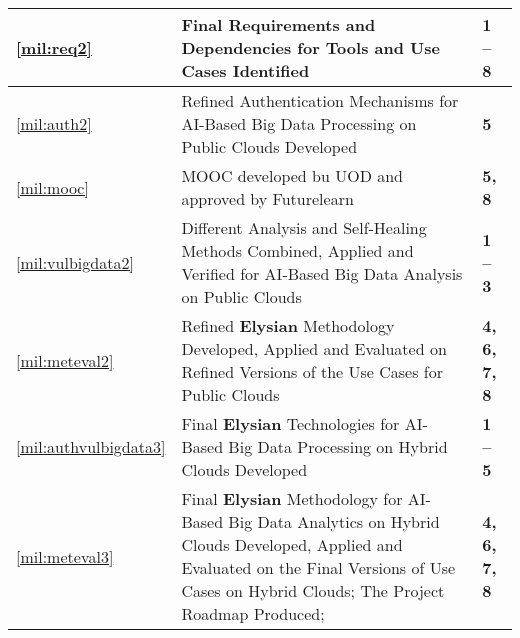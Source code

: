 \documentclass[a4paper,11pt]{article}
\newcommand{\project}[1]{\textbf{#1}\xspace}
\newcommand{\SECURITY}{\project{Elysian}}
\newcommand{\TheProject}{\SECURITY}
\begin{document}
\begin{center}
\begin{tabular*}{\textwidth}{|p{1.2cm}|p{13.3cm}|p{2.2cm}|}
\ref{mil:req2} & Final Requirements and Dependencies for Tools and Use Cases Identified & \textbf{1 -- 8} \\
  \hline
\ref{mil:auth2} & Refined Authentication Mechanisms for AI-Based Big Data Processing on Public Clouds Developed & \textbf{5} \\
\hline
\ref{mil:mooc} & MOOC developed bu UOD and approved by Futurelearn & \textbf{5, 8} \\
\hline
\ref{mil:vulbigdata2} & Different Analysis and Self-Healing Methods Combined, Applied and Verified for AI-Based Big Data Analysis on Public Clouds & \textbf{1 -- 3} \\
\hline
\ref{mil:meteval2} & Refined \TheProject{} Methodology Developed, Applied and Evaluated on Refined Versions of the Use Cases for Public Clouds & \textbf{4, 6, 7, 8} \\
\hline
\ref{mil:authvulbigdata3} & Final \TheProject{} Technologies for AI-Based Big Data Processing on Hybrid Clouds Developed & \textbf{1 -- 5} \\
\hline
\ref{mil:meteval3} & Final \TheProject{} Methodology for AI-Based Big Data Analytics on Hybrid Clouds Developed, Applied and Evaluated on the Final Versions of Use Cases on Hybrid Clouds; The Project Roadmap Produced; & \textbf{4, 6, 7, 8} \\
\hline

  
\end{tabular*}
\end{center}
\end{document}

